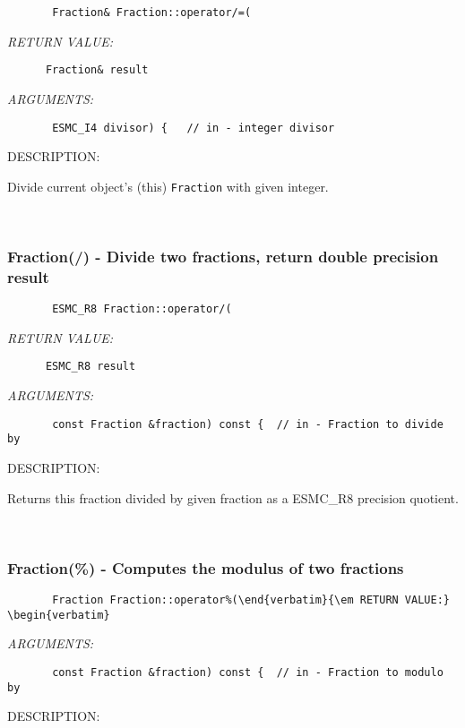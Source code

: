   
\begin{verbatim}       Fraction& Fraction::operator/=(\end{verbatim}{\em RETURN VALUE:}
\begin{verbatim}      Fraction& result\end{verbatim}{\em ARGUMENTS:}
\begin{verbatim}       ESMC_I4 divisor) {   // in - integer divisor\end{verbatim}
{\sf DESCRIPTION:\\ }


        Divide current object's (this) {\tt Fraction} with given
        integer. 
 
\mbox{}\hrulefill\ 
 
\subsubsection [Fraction(/)] {Fraction(/) - Divide two fractions, return double precision result}


  
\begin{verbatim}       ESMC_R8 Fraction::operator/(\end{verbatim}{\em RETURN VALUE:}
\begin{verbatim}      ESMC_R8 result\end{verbatim}{\em ARGUMENTS:}
\begin{verbatim}       const Fraction &fraction) const {  // in - Fraction to divide by\end{verbatim}
{\sf DESCRIPTION:\\ }


      Returns this fraction divided by given fraction as a ESMC_R8
      precision quotient.
   
 
\mbox{}\hrulefill\ 
 
\subsubsection [Fraction(\%)] {Fraction(\%) - Computes the modulus of two fractions}


  
\begin{verbatim}       Fraction Fraction::operator%(\end{verbatim}{\em RETURN VALUE:}
\begin{verbatim} \end{verbatim}{\em ARGUMENTS:}
\begin{verbatim}       const Fraction &fraction) const {  // in - Fraction to modulo by\end{verbatim}
{\sf DESCRIPTION:\\ }


